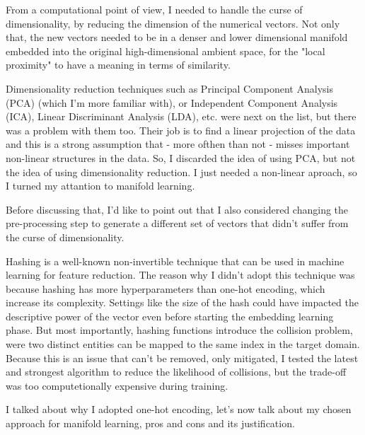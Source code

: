 From a computational point of view, I needed to handle the curse of dimensionality, by reducing the dimension of the numerical vectors.
Not only that, the new vectors needed to be in a denser and lower dimensional manifold embedded into the original high-dimensional ambient space,
for the "local proximity" to have a meaning in terms of similarity.

Dimensionality reduction techniques such as Principal Component Analysis (PCA) (which I'm more familiar with), or
Independent Component Analysis (ICA), Linear Discriminant Analysis (LDA), etc. were next on the list, but there was a problem with them too.
Their job is to find a linear projection of the data and this is a strong assumption that - more ofthen than not - misses important non-linear
structures in the data. So, I discarded the idea of using PCA, but not the idea of using dimensionality reduction.
I just needed a non-linear aproach, so I turned my attantion to manifold learning.

Before discussing that, I'd like to point out that I also considered changing the pre-processing step to generate a different
set of vectors that didn't suffer from the curse of dimensionality.

Hashing is a well-known non-invertible technique that can be used in machine learning for feature reduction.
The reason why I didn't adopt this technique was because hashing has more hyperparameters than one-hot encoding, which increase its complexity.
Settings like the size of the hash could have impacted the descriptive power of the vector even before starting the embedding learning phase.
But most importantly, hashing functions introduce the collision problem, were two distinct entities can be mapped to the same index in the target domain.
Because this is an issue that can't be removed, only mitigated, I tested the latest and strongest algorithm to reduce the likelihood of collisions,
but the trade-off was too computetionally expensive during training.

I talked about why I adopted one-hot encoding, let's now talk about my chosen approach for manifold learning, pros and cons and its justification.
